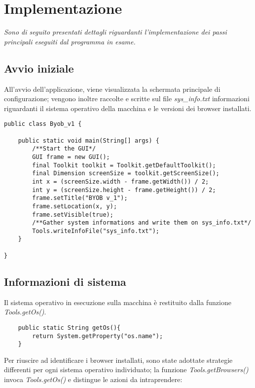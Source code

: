 \chapter{Implementazione}
\label{chap:implementazione}
\begin{minipage}{12cm}\textit{Sono di seguito presentati dettagli riguardanti l'implementazione dei passi principali eseguiti dal programma in esame. }
\end{minipage}

\section{Avvio iniziale}
All'avvio dell'applicazione, viene visualizzata la schermata principale di configurazione; vengono inoltre raccolte e scritte sul file \textit{sys\_info.txt} informazioni riguardanti il sistema operativo della macchina e le versioni dei browser installati.

\vspace{0.5cm}
\begin{lstlisting}
public class Byob_v1 {

	public static void main(String[] args) {
		/**Start the GUI*/
		GUI frame = new GUI();
		final Toolkit toolkit = Toolkit.getDefaultToolkit();
		final Dimension screenSize = toolkit.getScreenSize();
		int x = (screenSize.width - frame.getWidth()) / 2;
		int y = (screenSize.height - frame.getHeight()) / 2;
		frame.setTitle("BYOB v_1");
		frame.setLocation(x, y);
		frame.setVisible(true);
		/**Gather system informations and write them on sys_info.txt*/
		Tools.writeInfoFile("sys_info.txt");
	}

}
\end{lstlisting}

\section{Informazioni di sistema}

Il sistema operativo in esecuzione sulla macchina \`{e} restituito dalla funzione \textit{Tools.getOs()}.

\vspace{0.5cm}
\begin{lstlisting}
    public static String getOs(){
	    return System.getProperty("os.name");
    }
\end{lstlisting}

Per riuscire ad identificare i browser installati, sono state adottate strategie differenti per ogni sistema operativo individuato;
la funzione \textit{Tools.getBrowsers()} invoca \textit{Tools.getOs()} e distingue le azioni da intraprendere:

